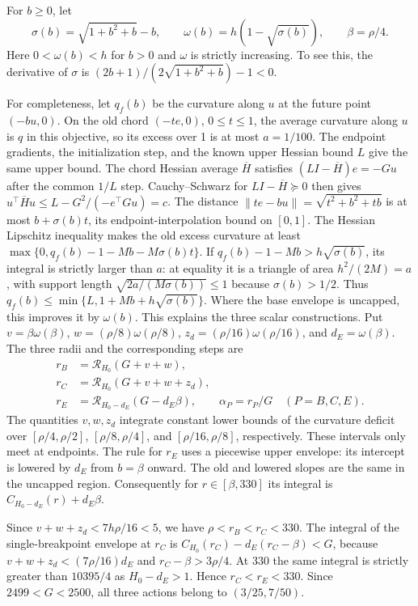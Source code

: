 \documentclass[11pt]{article}
\newcommand{\norm}[1]{\lVert#1\rVert}
\begin{document}
For \(b\ge0\), let
\[
 \sigma(b)=\sqrt{1+b^2+b}-b,\qquad
 \omega(b)=h(1-\sqrt{\sigma(b)}),\qquad \beta=\rho/4.
\]
Here \(0<\omega(b)<h\) for \(b>0\) and \(\omega\) is
strictly increasing. To see this, the derivative of
\(\sigma\) is \((2b+1)/(2\sqrt{1+b^2+b})-1<0\).

For completeness, let \(q_f(b)\) be the curvature along \(u\) at
the future point \((-bu,0)\). On the old chord \((-te,0)\),
\(0\le t\le1\), the average curvature along \(u\) is \(q\)
in this objective, so its excess over 1 is at most \(a=1/100\).
The endpoint gradients, the initialization step, and the known upper
Hessian bound \(L\) give the same upper bound.
The chord Hessian average \(\overline H\) satisfies
\((LI-\overline H)e=-Gu\) after the common \(1/L\) step.
Cauchy--Schwarz for \(LI-\overline H\succeq0\) then gives
\(u^\top\overline H u\le L-G^2/(-e^\top Gu)=c\).
The distance \(\norm{te-bu}=\sqrt{t^2+b^2+tb}\) is at most
\(b+\sigma(b)t\), its endpoint-interpolation bound on \([0,1]\).
The Hessian Lipschitz inequality makes the old excess curvature
at least \(\max\{0,q_f(b)-1-Mb-M\sigma(b)t\}\).
If \(q_f(b)-1-Mb>h\sqrt{\sigma(b)}\), its integral is strictly
larger than \(a\): at equality it is a triangle of area
\(h^2/(2M)=a\), with support length
\(\sqrt{2a/(M\sigma(b))}\le1\) because \(\sigma(b)>1/2\).
Thus \(q_f(b)\le\min\{L,1+Mb+h\sqrt{\sigma(b)}\}\).
Where the base envelope is uncapped, this improves it by
\(\omega(b)\). This explains the three scalar constructions.
Put \(v=\beta\omega(\beta)\),
\(w=(\rho/8)\omega(\rho/8)\),
\(z_d=(\rho/16)\omega(\rho/16)\), and \(d_E=\omega(\beta)\).
The three radii and the corresponding steps are
\[
 \begin{aligned}
 r_B&=\mathcal R_{H_0}(G+v+w),\\
 r_C&=\mathcal R_{H_0}(G+v+w+z_d),\\
 r_E&=\mathcal R_{H_0-d_E}(G-d_E\beta),\qquad
 \alpha_P=r_P/G\quad(P=B,C,E).
 \end{aligned}
\]
The quantities \(v,w,z_d\) integrate constant lower bounds of the
curvature deficit over \([\rho/4,\rho/2]\),
\([\rho/8,\rho/4]\), and \([\rho/16,\rho/8]\), respectively.
These intervals only meet at endpoints. The rule for \(r_E\) uses a
piecewise upper envelope: its intercept is lowered by \(d_E\)
from \(b=\beta\) onward. The old and lowered slopes are the same
in the uncapped region. Consequently for \(r\in[\beta,330]\)
its integral is \(C_{H_0-d_E}(r)+d_E\beta\).

Since \(v+w+z_d<7h\rho/16<5\), we have
\(\rho<r_B<r_C<330\). The integral of the single-breakpoint
envelope at \(r_C\) is
\(C_{H_0}(r_C)-d_E(r_C-\beta)<G\), because
\(v+w+z_d<(7\rho/16)d_E\) and \(r_C-\beta>3\rho/4\).
At \(330\) the same integral is strictly greater than \(10395/4\)
as \(H_0-d_E>1\). Hence \(r_C<r_E<330\). Since \(2499<G<2500\),
all three actions belong to \((3/25,7/50)\).
\end{document}
